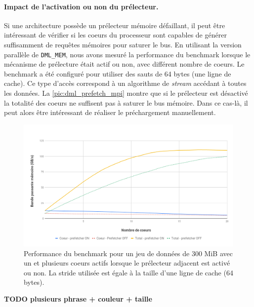        \paragraph{Impact de l'activation ou non du prélecteur.} 
            Si une architecture possède un prélecteur mémoire défaillant, il peut être intéressant de vérifier si les coeurs du processeur sont capables de générer suffisamment de requêtes mémoires pour saturer le bus.
            En utilisant la version parallèle de \verb=DML_MEM=, nous avons mesuré la performance du benchmark lorsque le mécanisme de prélecture était actif ou non, avec différent nombre de coeurs. Le benchmark a été configuré pour utiliser des sauts de 64 bytes (une ligne de cache). Ce type d'accès correspond à un algorithme de \textit{stream} accédant à toutes les données.  La \autoref{pic:dml_prefetch_mpi} montre que si le prélecteur est désactivé la totalité des coeurs ne suffisent pas à saturer le bus mémoire. Dans ce cas-là, il peut alors être intéressant de réaliser le préchargement manuellement.
        
                \begin{figure}
                \center
                \includegraphics[width=14cm]{images/dml_prefetch_mpi.png}
                \caption{\label{pic:dml_prefetch_mpi} Performance du benchmark pour un jeu de données de 300 MiB avec un et plusieurs coeurs actifs lorsque le prélecteur adjacent est activé ou non. La stride utilisée est égale à la taille d'une ligne de cache (64 bytes).}
                \end{figure}
                \textbf{TODO plusieurs phrase + couleur + taille}

        
